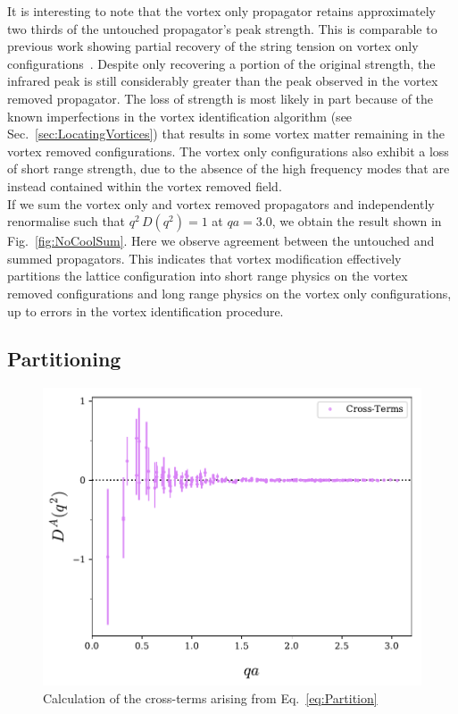 It is interesting to note that the vortex only propagator retains approximately two thirds of the untouched propagator's peak strength. This is comparable to previous work showing partial recovery of the string tension on vortex only configurations~\cite{Trewartha:2015ida,Trewartha:2017ive,Langfeld:2003ev,Stack:2002sy}. Despite only recovering a portion of the original strength, the infrared peak is still considerably greater than the peak observed in the vortex removed propagator. The loss of strength is most likely in part because of the known imperfections in the vortex identification algorithm (see Sec.~\ref{sec:LocatingVortices}) that results in some vortex matter remaining in the vortex removed configurations. The vortex only configurations also exhibit a loss of short range strength, due to the absence of the high frequency modes that are instead contained within the vortex removed field.\\

If we sum the vortex only and vortex removed propagators and independently renormalise such that $q^2\,D(q^2)=1$ at $qa=3.0$, we obtain the result shown in Fig.~\ref{fig:NoCoolSum}. Here we observe agreement between the untouched and summed propagators. This indicates that vortex modification effectively partitions the lattice configuration into short range physics on the vortex removed configurations and long range physics on the vortex only configurations, up to errors in the vortex identification procedure.

\subsection{Partitioning}

\begin{figure}[tb]
\centering
\includegraphics[width=\linewidth]{./ScalarGluComp_q2_CrossTerms.pdf}
\caption{\label{fig:CrossTerms} Calculation of the cross-terms arising from Eq.~\ref{eq:Partition}}
\end{figure}

